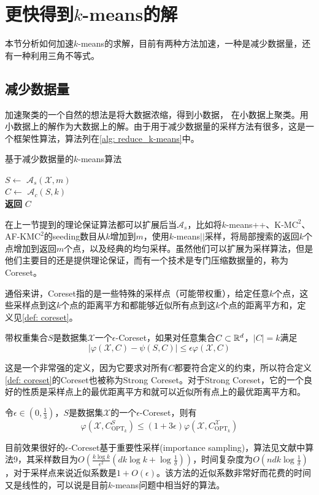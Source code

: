 \section{更快得到\texorpdfstring{$k$}{k}-means的解}
本节分析如何加速$k$-means的求解，目前有两种方法加速，一种是减少数据量，还有一种利用三角不等式。
\subsection{减少数据量}
加速聚类的一个自然的想法是将大数据浓缩，得到小数据，
在小数据上聚类。用小数据上的解作为大数据上的解。由于用于减少数据量的采样方法有很多，这是一个框架性算法，算法列在\ref{alg: reduce_k-means}中。
\begin{algorithm}
    \caption{基于减少数据量的$k$-means算法}\label{alg: reduce_k-means}
    $S \gets$ $\mathcal{A}_s(\mathcal{X},m)$ \\
    $C \gets$ $\mathcal{A}_c(S,k)$ \\
    \textbf{返回} $C$
\end{algorithm}
在上一节提到的理论保证算法都可以扩展后当$\mathcal{A}_s$，比如将$k$-means++、K-M$\text{C}^2$、AF-KM$\text{C}^2$的seeding数目从$k$增加到$m$，使用$k$-means\(\vert \vert\)采样，将局部搜索的返回$k$个点增加到返回$m$个点，以及经典的均匀采样。虽然他们可以扩展为采样算法，但是他们主要目的还是提供理论保证，而有一个技术是专门压缩数据量的，称为Coreset。

通俗来讲，Coreset指的是一些特殊的采样点（可能带权重），给定任意$k$个点，这些采样点到这$k$个点的距离平方和都能够近似所有点到这$k$个点的距离平方和，定义见\ref{def: coreset}。
\begin{definition}[常规Coreset]
    \label{def: coreset}
    带权重集合$S$是数据集$\mathcal{X}$一个$\epsilon$-Coreset，如果对任意集合$C \subset \mathbb{R}^d$，$|C|=k$满足
    \begin{equation*}
        |\varphi(\mathcal{X},C) - \psi (S,C)| \leq \epsilon \varphi(\mathcal{X},C)
    \end{equation*}
\end{definition}
这是一个非常强的定义，因为它要求对所有$C$都要符合定义的约束，所以符合定义\ref{def: coreset}的Coreset也被称为Strong Coreset。对于Strong Coreset，它的一个良好的性质是采样点上的最优距离平方和就可以近似所有点上的最优距离平方和。
\begin{corollary}[Coreset性质1]
    \label{cor: coreset_property1}
    令$\epsilon \in (0, \frac{1}{3})$，$S$是数据集$\mathcal{X}$的一个$\epsilon$-Coreset，则有
    \begin{equation*}
        \varphi(\mathcal{X},C_{\text{OPT}_k}^S) \leq (1+3\epsilon) \varphi(\mathcal{X},C_{\text{OPT}_k}^{\mathcal{X}})
    \end{equation*}
\end{corollary}
目前效果很好的$\epsilon$-Coreset基于重要性采样(importance sampling)，算法见文献\cite{bachem2018sampling}中算法9，其采样数目为$O(\frac{k\log k}{\epsilon^2}(dk\log k+\log\frac{1}{\delta}))$，时间复杂度为$O(ndk\log\frac{1}{\delta})$，对于采样点来说近似系数是$1+O(\epsilon)$。该方法的近似系数非常好而花费的时间又是线性的，可以说是目前$k$-means问题中相当好的算法。

